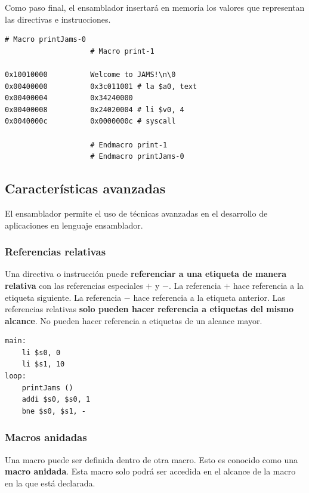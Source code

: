 Como paso final, el ensamblador insertará en memoria los valores
que representan las directivas e instrucciones.

\begin{lstlisting}[frame=single,label={lst:value-assignation}]
                    # Macro printJams-0
                    # Macro print-1

0x10010000          Welcome to JAMS!\n\0
0x00400000          0x3c011001 # la $a0, text
0x00400004          0x34240000
0x00400008          0x24020004 # li $v0, 4
0x0040000c          0x0000000c # syscall

                    # Endmacro print-1
                    # Endmacro printJams-0
\end{lstlisting}

\subsection{Características avanzadas}\label{subsec:características-avanzadas}

El ensamblador permite el uso de técnicas avanzadas en
el desarrollo de aplicaciones en lenguaje ensamblador.

\subsubsection{Referencias relativas}\label{subsubsec:referencias-relativas}

Una directiva o instrucción puede \textbf{referenciar a una etiqueta de manera
relativa} con las referencias especiales $+$ y $-$.
La referencia $+$ hace referencia a la etiqueta siguiente.
La referencia $-$ hace referencia a la etiqueta anterior.
Las referencias relativas \textbf{solo pueden hacer referencia
a etiquetas del mismo alcance}.
No pueden hacer referencia a etiquetas de un alcance mayor.

\begin{lstlisting}[frame=single,label={lst:relative-reference}]
main:
    li $s0, 0
    li $s1, 10
loop:
    printJams ()
    addi $s0, $s0, 1
    bne $s0, $s1, -
\end{lstlisting}

\subsubsection{Macros anidadas}\label{subsubsec:macros-anidadas}

Una macro puede ser definida dentro de otra macro.
Esto es conocido como una \textbf{macro anidada}.
Esta macro solo podrá ser accedida en el alcance de la macro
en la que está declarada.

